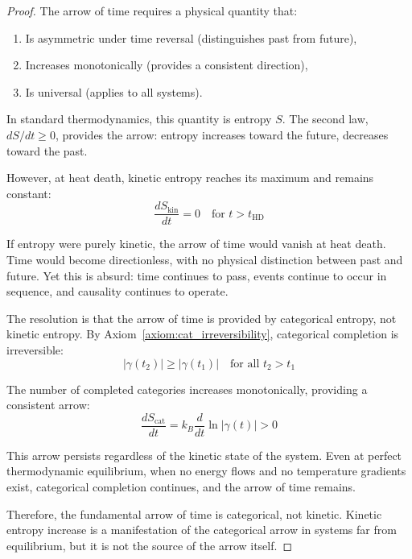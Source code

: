 \documentclass[12pt,a4paper]{article}
\theoremstyle{definition}
\theoremstyle{remark}
\begin{document}
\begin{proof}
The arrow of time requires a physical quantity that:
\begin{enumerate}
    \item Is asymmetric under time reversal (distinguishes past from future),
    \item Increases monotonically (provides a consistent direction),
    \item Is universal (applies to all systems).
\end{enumerate}

In standard thermodynamics, this quantity is entropy $S$. The second law, $dS/dt \geq 0$, provides the arrow: entropy increases toward the future, decreases toward the past.

However, at heat death, kinetic entropy reaches its maximum and remains constant:
\begin{equation}
\frac{dS_{\text{kin}}}{dt} = 0 \quad \text{for } t > t_{\text{HD}}
\end{equation}

If entropy were purely kinetic, the arrow of time would vanish at heat death. Time would become directionless, with no physical distinction between past and future. Yet this is absurd: time continues to pass, events continue to occur in sequence, and causality continues to operate.

The resolution is that the arrow of time is provided by categorical entropy, not kinetic entropy. By Axiom~\ref{axiom:cat_irreversibility}, categorical completion is irreversible:
\begin{equation}
|\gamma(t_2)| \geq |\gamma(t_1)| \quad \text{for all } t_2 > t_1
\end{equation}

The number of completed categories increases monotonically, providing a consistent arrow:
\begin{equation}
\frac{dS_{\text{cat}}}{dt} = k_B \frac{d}{dt} \ln |\gamma(t)| > 0
\end{equation}

This arrow persists regardless of the kinetic state of the system. Even at perfect thermodynamic equilibrium, when no energy flows and no temperature gradients exist, categorical completion continues, and the arrow of time remains.

Therefore, the fundamental arrow of time is categorical, not kinetic. Kinetic entropy increase is a manifestation of the categorical arrow in systems far from equilibrium, but it is not the source of the arrow itself.
\end{proof}
\end{document}
